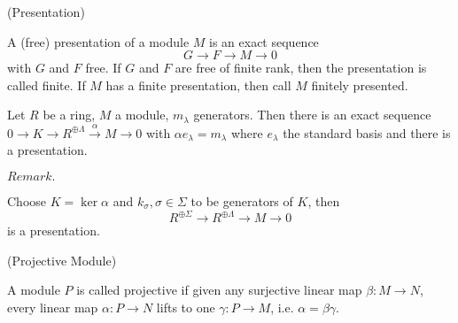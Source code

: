 \documentclass{article}
\begin{document}
    \begin{definition}
        (Presentation)\par
        A (free) presentation of a module $M$ is an exact sequence
        \[G\to F \to M \to 0\]
        with $G$ and $F$ free. If $G$ and $F$ are free of finite rank, then the presentation is called finite. If $M$ has a finite presentation, then call $M$ finitely presented.
    \end{definition}

    \begin{proposition}
        Let $R$ be a ring, $M$ a module, $m_{\lambda}$ generators. Then there is an  exact sequence $0\to K \to R^{\oplus\Lambda} \overset{\alpha}{\to} M \to 0$ with $\alpha e_{\lambda} = m_{\lambda}$ where $e_{\lambda}$ the standard basis and there is a presentation.
    \end{proposition}
    $Remark.$\par
    Choose $K = \ker \alpha$ and $k_{\sigma}, \sigma\in\Sigma$ to be generators of $K$, then 
    \[R^{\oplus \Sigma} \to R^{\oplus\Lambda} \to M \to 0\]
    is a presentation.

    \begin{definition}
        (Projective Module)\par
        A module $P$ is called projective if given any surjective linear map $\beta:M\to N$, every linear map $\alpha:P\to N$ lifts to one $\gamma:P\to M$, i.e. $\alpha = \beta\gamma$.
    \end{definition}
\end{document}
